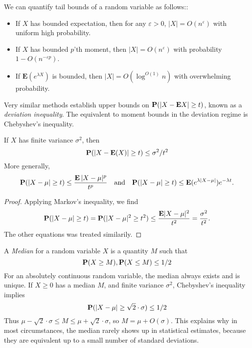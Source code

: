 We can quantify tail bounds of a random variable as follows::
%
\begin{itemize}
    \item If $X$ has bounded expectation, then for any $\varepsilon > 0$, $|X| = O(n^\varepsilon)$ with uniform high probability.

    \item If $X$ has bounded $p$'th moment, then $|X| = O(n^\varepsilon)$ with probability $1 - O(n^{-\varepsilon p})$.

    \item If $\mathbf{E}(e^{\lambda X})$ is bounded, then $|X| = O(\log^{O(1)} n)$ with overwhelming probability.
\end{itemize}
%
Very similar methods establish upper bounds on $\operatorname{\mathbf{P}}(|X - \mathbf{E} X| \geq t)$, known as a \emph{deviation inequality}. The equivalent to moment bounds in the deviation regime is Chebyshev's inequality.

\begin{theorem}
    If $X$ has finite variance $\sigma^2$, then
    \[ \mathbf{P}(|X - \operatorname{\mathbf{E}}(X)| \geq t) \leq \sigma^2 / t^2 \]
    More generally,
    \[ \mathbf{P}(|X - \mu| \geq t) \leq \frac{\operatorname{\mathbf{E}} |X - \mu|^p}{t^p} \quad \text{and} \quad \mathbf{P}(|X-\mu| \geq t) \leq \operatorname{\mathbf{E}}(e^{\lambda |X - \mu|}) e^{- \lambda t}. \]
\end{theorem}
\begin{proof}
    Applying Markov's inequality, we find
    \[ \mathbf{P}(|X - \mu| \geq t) = \mathbf{P}(|X - \mu|^2 \geq t^2) \leq \frac{\mathbf{E}|X - \mu|^2}{t^2} = \frac{\sigma^2}{t^2}. \]
    The other equations was treated similarily.
\end{proof}

\begin{example}
    A \emph{Median} for a random variable $X$ is a quantity $M$ such that
    \[ \operatorname{\mathbf{P}}(X \geq M), \operatorname{\mathbf{P}}(X \leq M) \leq 1/2 \]
    For an absolutely continuous random variable, the median always exists and is unique. If $X \geq 0$ has a median $M$, and finite variance $\sigma^2$, Chebyshev's inequality implies
    \[ \operatorname{\mathbf{P}}(|X - \mu| \geq \sqrt{2} \cdot \sigma) \leq 1/2 \]
    Thus $\mu - \sqrt{2} \cdot \sigma \leq M \leq \mu + \sqrt{2} \cdot \sigma$, so $M = \mu + O(\sigma)$. This explains why in most circumstances, the median rarely shows up in statistical estimates, because they are equivalent up to a small number of standard deviations.
\end{example}

